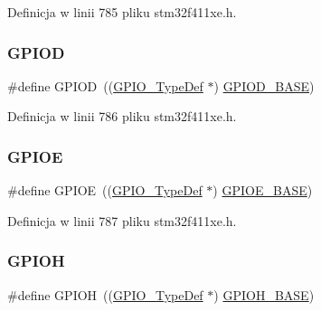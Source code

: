 Definicja w linii 785 pliku stm32f411xe.\+h.

\mbox{\label{group___peripheral__declaration_ga7580b1a929ea9df59725ba9c18eba6ac}} 
\subsubsection{\texorpdfstring{G\+P\+I\+OD}{GPIOD}}
{\footnotesize\ttfamily \#define G\+P\+I\+OD~((\hyperlink{struct_g_p_i_o___type_def}{G\+P\+I\+O\+\_\+\+Type\+Def} $\ast$) \hyperlink{group___peripheral__memory__map_ga1a93ab27129f04064089616910c296ec}{G\+P\+I\+O\+D\+\_\+\+B\+A\+SE})}



Definicja w linii 786 pliku stm32f411xe.\+h.

\mbox{\label{group___peripheral__declaration_gae04bdb5e8acc47cab1d0532e6b0d0763}} 
\subsubsection{\texorpdfstring{G\+P\+I\+OE}{GPIOE}}
{\footnotesize\ttfamily \#define G\+P\+I\+OE~((\hyperlink{struct_g_p_i_o___type_def}{G\+P\+I\+O\+\_\+\+Type\+Def} $\ast$) \hyperlink{group___peripheral__memory__map_gab487b1983d936c4fee3e9e88b95aad9d}{G\+P\+I\+O\+E\+\_\+\+B\+A\+SE})}



Definicja w linii 787 pliku stm32f411xe.\+h.

\mbox{\label{group___peripheral__declaration_gadeacbb43ae86c879945afe98c679b285}} 
\subsubsection{\texorpdfstring{G\+P\+I\+OH}{GPIOH}}
{\footnotesize\ttfamily \#define G\+P\+I\+OH~((\hyperlink{struct_g_p_i_o___type_def}{G\+P\+I\+O\+\_\+\+Type\+Def} $\ast$) \hyperlink{group___peripheral__memory__map_gaee4716389f3a1c727495375b76645608}{G\+P\+I\+O\+H\+\_\+\+B\+A\+SE})}



